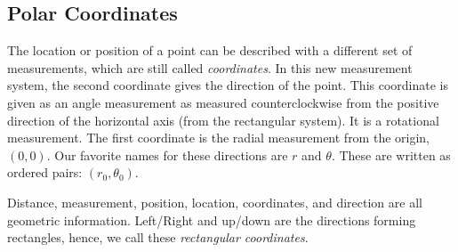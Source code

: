 \documentclass{ximera}
\begin{document}
\subsection*{Polar Coordinates}



The location or position of a point can be described with a different set of measurements, which are still called \textit{coordinates}.  In this new measurement system, the second coordinate gives the direction of the point. This coordinate is given as an angle measurement as measured counterclockwise from the positive direction of the horizontal axis (from the rectangular system). It is a rotational measurement.  The first coordinate is the radial measurement from the origin, $(0,0)$. Our favorite names for these directions are $r$ and $\theta$. These are written as ordered pairs: $(r_0, \theta_0)$.


Distance, measurement, position, location, coordinates, and direction are all geometric information.  Left/Right and up/down are the directions forming rectangles, hence, we call these \textit{rectangular coordinates}.








  \begin{image}
  \end{image}
\end{document}
